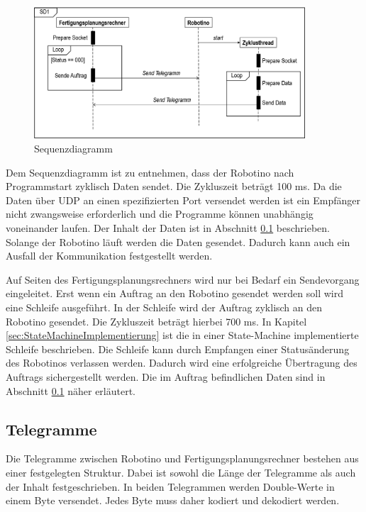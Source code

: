 \begin{figure}[htb]
    \centering
    \includegraphics[width=0.9\textwidth]{Abbildungen/Sequenzdiagramm.PNG}
    \caption{Sequenzdiagramm}		
    \label{fig:Sequenzdiagramm}
\end{figure}

Dem Sequenzdiagramm ist zu entnehmen, dass der Robotino nach Programmstart zyklisch Daten sendet. Die Zykluszeit beträgt 100 ms. Da die Daten über UDP an einen spezifizierten Port versendet werden ist ein Empfänger nicht zwangsweise erforderlich und die Programme können unabhängig voneinander laufen. Der Inhalt der Daten ist in Abschnitt \ref{sec:Telegramme} beschrieben. Solange der Robotino läuft werden die Daten gesendet. Dadurch kann auch ein Ausfall der Kommunikation festgestellt werden. 

Auf Seiten des Fertigungsplanungsrechners wird nur bei Bedarf ein Sendevorgang eingeleitet. Erst wenn ein Auftrag an den Robotino gesendet werden soll wird eine Schleife ausgeführt. In der Schleife wird der Auftrag zyklisch an den Robotino gesendet. Die Zykluszeit beträgt hierbei 700 ms. In Kapitel \ref{sec:StateMachineImplementierung} ist die in einer State-Machine implementierte Schleife beschrieben. Die Schleife kann durch Empfangen einer Statusänderung des Robotinos verlassen werden. Dadurch wird eine erfolgreiche Übertragung des Auftrags sichergestellt werden. Die im Auftrag befindlichen Daten sind in Abschnitt \ref{sec:Telegramme} näher erläutert.

\subsection{Telegramme}
\label{sec:Telegramme}

Die Telegramme zwischen Robotino und Fertigungsplanungsrechner bestehen aus einer festgelegten Struktur. Dabei ist sowohl die Länge der Telegramme als auch der Inhalt festgeschrieben. In beiden Telegrammen werden Double-Werte in einem Byte versendet. Jedes Byte muss daher kodiert und dekodiert werden. 

